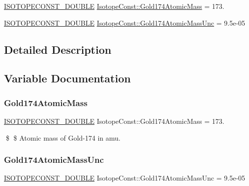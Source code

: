 \begin{DoxyCompactItemize}
\item 
\mbox{\hyperlink{group___isotope_const-_macros_ga8f45a7272ce02c0b4c65c44636ed719a}{I\+S\+O\+T\+O\+P\+E\+C\+O\+N\+S\+T\+\_\+\+D\+O\+U\+B\+LE}} \mbox{\hyperlink{group___isotope_const-_gold-_au174_gaea44b6c1708b46ec4b24975eb13d274a}{Isotope\+Const\+::\+Gold174\+Atomic\+Mass}} = 173.
\item 
\mbox{\hyperlink{group___isotope_const-_macros_ga8f45a7272ce02c0b4c65c44636ed719a}{I\+S\+O\+T\+O\+P\+E\+C\+O\+N\+S\+T\+\_\+\+D\+O\+U\+B\+LE}} \mbox{\hyperlink{group___isotope_const-_gold-_au174_gaec9df638000fa7ff9c4f70f2f5d0c8e0}{Isotope\+Const\+::\+Gold174\+Atomic\+Mass\+Unc}} = 9.\+5e-\/05
\end{DoxyCompactItemize}


\subsection{Detailed Description}


\subsection{Variable Documentation}
\mbox{\label{group___isotope_const-_gold-_au174_gaea44b6c1708b46ec4b24975eb13d274a}} 
\subsubsection{\texorpdfstring{Gold174\+Atomic\+Mass}{Gold174AtomicMass}}
{\footnotesize\ttfamily \mbox{\hyperlink{group___isotope_const-_macros_ga8f45a7272ce02c0b4c65c44636ed719a}{I\+S\+O\+T\+O\+P\+E\+C\+O\+N\+S\+T\+\_\+\+D\+O\+U\+B\+LE}} Isotope\+Const\+::\+Gold174\+Atomic\+Mass = 173.}

\$ \$ Atomic mass of Gold-\/174 in amu. \mbox{\label{group___isotope_const-_gold-_au174_gaec9df638000fa7ff9c4f70f2f5d0c8e0}} 
\subsubsection{\texorpdfstring{Gold174\+Atomic\+Mass\+Unc}{Gold174AtomicMassUnc}}
{\footnotesize\ttfamily \mbox{\hyperlink{group___isotope_const-_macros_ga8f45a7272ce02c0b4c65c44636ed719a}{I\+S\+O\+T\+O\+P\+E\+C\+O\+N\+S\+T\+\_\+\+D\+O\+U\+B\+LE}} Isotope\+Const\+::\+Gold174\+Atomic\+Mass\+Unc = 9.\+5e-\/05}

